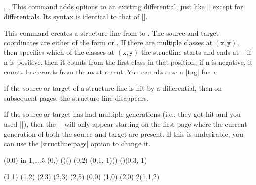 \begin{sseqdata}[|| name = ex1, cohomological Serre grading]
\begin{commandlist}{
    {\doptions\moptions{}},
    {\doptions\moptions{}\pars{\sourcename\opt{,\targetn}}},
    {\doptions\moptions{}\pars{\sourcecoord}\pars{\targetcoord}}%
}
This command adds options to an existing differential, just like |\classoptions| except for differentials. Its syntax is identical to that of |\d|.
\end{commandlist}

\begin{command}{\structline\ooptions\pars{\sourcecoord}\pars{\targetcoord}}
This command creates a structure line from \sourcecoord\space to \targetcoord. The source and target coordinates are either of the form  or . If there are multiple classes at $\mathtt{(x,y)}$, then  specifies which of the classes at $\mathtt{(x,y)}$ the structline starts and ends at -- if n is positive, then it counts from the first class in that position, if n is negative, it counts backwards from the most recent. You can also use a |tag| for n.

If the source or target of a structure line is hit by a differential, then on subsequent pages, the structure line disappears.

If the source or target has had multiple generations (i.e., they got hit and you used |\replaceclass|), then the |\structline| will only appear starting on the first page where the current generation of both the source and target are present. If this is undesirable, you can use the |structline:page| option to change it.
\begin{codeexample}[width = 7cm]
\DeclareSseqGroup\tower {} {
    \class(0,0)
    \foreach \y in {1,...,5} {
        \class(0,\y)
        \structline()(\lastclass)
    }
    \class(0,2)
    \structline(0,1,-1)(\lastclass)
    \structline(\lastclass)(0,3,-1)
}
\begin{sseqdata}[ name = structline example,
                  classes = { circle, fill },
                  Adams grading, no axes,
                  yscale = 1.39 ]
\class(1,1) \class(1,2)
\class(2,3) \class(2,3) \class(2,5)
\tower[classes = blue](0,0)
\tower[struct lines = dashed,orange](1,0)
\tower[struct lines = red](2,0)
\d2(1,1,2)
\end{sseqdata}
\printpage[ name = structline example, page = 2 ] \quad
\printpage[ name = structline example, page = 3 ]
\end{codeexample}
\end{command}


\end{sseqdata}

